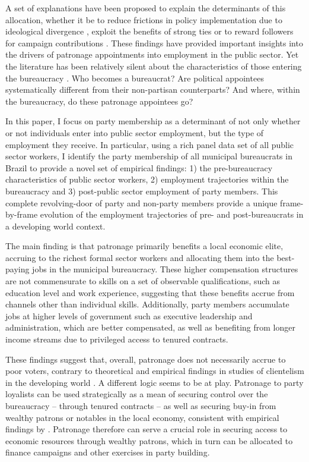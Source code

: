 \documentclass[12pt,a4paper]{article}
\begin{document}
A set of explanations have been proposed to explain the determinants of this allocation, whether it be to reduce frictions in policy implementation due to ideological divergence \citep{krause2016experiential}, exploit the benefits of strong ties \citep{toral2019benefits} or to reward followers for campaign contributions \citep{colonnelli2018patronage}. These findings have provided important insights into the drivers of patronage appointments into employment in the public sector. Yet the literature has been relatively silent about the characteristics of those entering the bureaucracy \citep{finan2015personnel}. Who becomes a bureaucrat? Are political appointees systematically different from their non-partisan counterparts? And where, within the bureaucracy, do these patronage appointees go?

In this paper, I focus on party membership as a determinant of not only whether or not individuals enter into public sector employment, but the type of employment they receive. In particular, using a rich panel data set of all public sector workers, I identify the party membership of all municipal bureaucrats in Brazil to provide a novel set of empirical findings: 1) the pre-bureaucracy characteristics of public sector workers, 2) employment trajectories within the bureaucracy and 3) post-public sector employment of party members. This complete revolving-door of party and non-party members provide a unique frame-by-frame evolution of the employment trajectories of pre- and post-bureaucrats in a developing world context.

The main finding is that patronage primarily benefits a local economic elite, accruing to the richest formal sector workers and allocating them into the best-paying jobs in the municipal bureaucracy. These higher compensation structures are not commensurate to skills on a set of observable qualifications, such as education level and work experience, suggesting that these benefits accrue from channels other than individual skills. Additionally, party members accumulate jobs at higher levels of government such as executive leadership and administration, which are better compensated, as well as benefiting from longer income streams due to privileged access to tenured contracts.

These findings suggest that, overall, patronage does not necessarily accrue to poor voters, contrary to theoretical and empirical findings in studies of clientelism in the developing world \citep{stokes2013brokers}. A different logic seems to be at play. Patronage to party loyalists can be used strategically as a mean of securing control over the bureaucracy -- through tenured contracts -- as well as securing buy-in from wealthy patrons or notables in the local economy, consistent with empirical findings by \citet{colonnelli2018patronage}. Patronage therefore can serve a crucial role in securing access to economic resources through wealthy patrons, which in turn can be allocated to finance campaigns and other exercises in party building.
\end{document}
